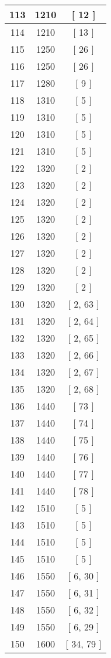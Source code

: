\begin{center}
\begin{longtable}[H]{|| c c c ||}
113 & 1210 & [ 12 ]
\\\hline
114 & 1210 & [ 13 ]
\\\hline
115 & 1250 & [ 26 ]
\\\hline
116 & 1250 & [ 26 ]
\\\hline
117 & 1280 & [ 9 ]
\\\hline
118 & 1310 & [ 5 ]
\\\hline
119 & 1310 & [ 5 ]
\\\hline
120 & 1310 & [ 5 ]
\\\hline
121 & 1310 & [ 5 ]
\\\hline
122 & 1320 & [ 2 ]
\\\hline
123 & 1320 & [ 2 ]
\\\hline
124 & 1320 & [ 2 ]
\\\hline
125 & 1320 & [ 2 ]
\\\hline
126 & 1320 & [ 2 ]
\\\hline
127 & 1320 & [ 2 ]
\\\hline
128 & 1320 & [ 2 ]
\\\hline
129 & 1320 & [ 2 ]
\\\hline
130 & 1320 & [ 2, 63 ]
\\\hline
131 & 1320 & [ 2, 64 ]
\\\hline
132 & 1320 & [ 2, 65 ]
\\\hline
133 & 1320 & [ 2, 66 ]
\\\hline
134 & 1320 & [ 2, 67 ]
\\\hline
135 & 1320 & [ 2, 68 ]
\\\hline
136 & 1440 & [ 73 ]
\\\hline
137 & 1440 & [ 74 ]
\\\hline
138 & 1440 & [ 75 ]
\\\hline
139 & 1440 & [ 76 ]
\\\hline
140 & 1440 & [ 77 ]
\\\hline
141 & 1440 & [ 78 ]
\\\hline
142 & 1510 & [ 5 ]
\\\hline
143 & 1510 & [ 5 ]
\\\hline
144 & 1510 & [ 5 ]
\\\hline
145 & 1510 & [ 5 ]
\\\hline
146 & 1550 & [ 6, 30 ]
\\\hline
147 & 1550 & [ 6, 31 ]
\\\hline
148 & 1550 & [ 6, 32 ]
\\\hline
149 & 1550 & [ 6, 29 ]
\\\hline
150 & 1600 & [ 34, 79 ]
\\\hline

\end{longtable}
\end{center}
